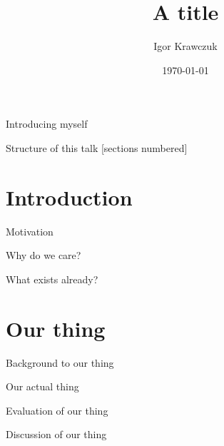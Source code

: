 \documentclass[10pt]{beamer}
\title{A title}
\date{\today}
\author{Igor Krawczuk}
\begin{document}
\maketitle



\begin{frame}[fragile]{Introducing myself}
\end{frame}

\begin{frame}{Structure of this talk}
  [sections numbered]
  \tableofcontents[hideallsubsections]
\end{frame}

\section{Introduction}
\begin{frame}[fragile]{Motivation}
  \cite{Knuth92}
  \cite{greenwade93}
\end{frame}
\begin{frame}[fragile]{Why do we care?}
\end{frame}
\begin{frame}[fragile]{What exists already?}
\end{frame}

\section{Our thing}

\begin{frame}{Background to our thing}
\end{frame}


\begin{frame}{Our actual thing}
\end{frame}

\begin{frame}{Evaluation of our thing}
\end{frame}
\begin{frame}{Discussion of our thing}
\end{frame}
\end{document}
